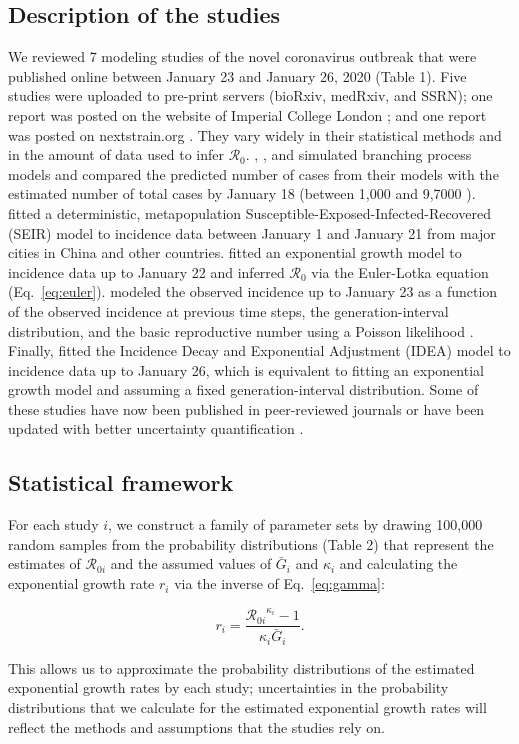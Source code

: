 \documentclass[12pt]{article}
\newcommand{\eref}[1]{Eq.~\ref{eq:#1}}
\newcommand{\Rx}[1]{\ensuremath{{\mathcal R}_{#1}}\xspace}
\newcommand{\Ro}{\ensuremath{{\mathcal R}_{0}}\xspace}
\begin{document}
\subsection{Description of the studies}

We reviewed 7 modeling studies of the novel coronavirus outbreak that were published online between January 23 and January 26, 2020 (Table 1).
Five studies \citep{liuncov, majumderncov, readncov, riouncov, zhaoncov} were uploaded to pre-print servers (bioRxiv, medRxiv, and SSRN); one report was posted on the website of Imperial College London \citep{imaincov}; and one report was posted on nextstrain.org \citep{bedfordncov}.
They vary widely in their statistical methods and in the amount of data used to infer \Ro.
\cite{bedfordncov}, \cite{imaincov}, and \cite{riouncov} simulated branching process models and compared the predicted number of cases from their models with the estimated number of total cases by January 18 (between 1,000 and 9,7000 \citep{imaincov0}).
\cite{readncov} fitted a deterministic, metapopulation Susceptible-Exposed-Infected-Recovered (SEIR) model to incidence data between January 1 and January 21 from major cities in China and other countries.
\cite{zhaoncov} fitted an exponential growth model to incidence data up to January 22 and inferred \Ro via the Euler-Lotka equation (\eref{euler}).
\cite{liuncov} modeled the observed incidence up to January 23 as a function of the observed incidence at previous time steps, the generation-interval distribution, and the basic reproductive number using a Poisson likelihood \citep{forsberg2008likelihood}.
Finally, \cite{majumderncov} fitted the Incidence Decay and Exponential Adjustment (IDEA) model \citep{fisman2013idea} to incidence data up to January 26, which is equivalent to fitting an exponential growth model and assuming a fixed generation-interval distribution.
Some of these studies have now been published in peer-reviewed journals \citep{riou2020pattern, zhao2020preliminary} or have been updated with better uncertainty quantification \citep{readncov2}.

\subsection{Statistical framework}

For each study $i$, we construct a family of parameter sets by drawing 100,000 random samples from the probability distributions (Table 2) that represent the estimates of \Rx{0i} and the assumed values of $\bar G_i$ and $\kappa_i$ and calculating the exponential growth rate $r_i$ via the inverse of \eref{gamma}:
\begin{linenomath*}
\begin{equation}
r_i = \frac{\Rx{0i}^{\kappa_i} - 1}{\kappa_i \bar{G}_i}.
\end{equation}
\end{linenomath*}
This allows us to approximate the probability distributions of the estimated exponential growth rates by each study;
uncertainties in the probability distributions that we calculate for the estimated exponential growth rates will reflect the methods and assumptions that the studies rely on.
\end{document}
